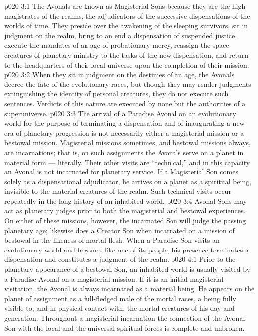 \vs p020 3:1 The Avonals are known as Magisterial Sons because they are the high magistrates of the realms, the adjudicators of the successive dispensations of the worlds of time. They preside over the awakening of the sleeping survivors, sit in judgment on the realm, bring to an end a dispensation of suspended justice, execute the mandates of an age of probationary mercy, reassign the space creatures of planetary ministry to the tasks of the new dispensation, and return to the headquarters of their local universe upon the completion of their mission.
\vs p020 3:2 When they sit in judgment on the destinies of an age, the Avonals decree the fate of the evolutionary races, but though they may render judgments extinguishing the identity of personal creatures, they do not execute such sentences. Verdicts of this nature are executed by none but the authorities of a superuniverse.
\vs p020 3:3 The arrival of a Paradise Avonal on an evolutionary world for the purpose of terminating a dispensation and of inaugurating a new era of planetary progression is not necessarily either a magisterial mission or a bestowal mission. Magisterial missions sometimes, and bestowal missions always, are incarnations; that is, on such assignments the Avonals serve on a planet in material form --- literally. Their other visits are “technical,” and in this capacity an Avonal is not incarnated for planetary service. If a Magisterial Son comes solely as a dispensational adjudicator, he arrives on a planet as a spiritual being, invisible to the material creatures of the realm. Such technical visits occur repeatedly in the long history of an inhabited world.
\vs p020 3:4 Avonal Sons may act as planetary judges prior to both the magisterial and bestowal experiences. On either of these missions, however, the incarnated Son will judge the passing planetary age; likewise does a Creator Son when incarnated on a mission of bestowal in the likeness of mortal flesh. When a Paradise Son visits an evolutionary world and becomes like one of its people, his presence terminates a dispensation and constitutes a judgment of the realm.
\vs p020 4:1 Prior to the planetary appearance of a bestowal Son, an inhabited world is usually visited by a Paradise Avonal on a magisterial mission. If it is an initial magisterial visitation, the Avonal is always incarnated as a material being. He appears on the planet of assignment as a full\hyp{}fledged male of the mortal races, a being fully visible to, and in physical contact with, the mortal creatures of his day and generation. Throughout a magisterial incarnation the connection of the Avonal Son with the local and the universal spiritual forces is complete and unbroken.
